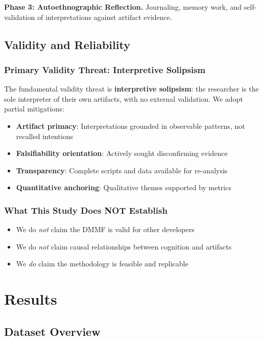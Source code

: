 \documentclass{ntlabs-preprint}
\begin{document}
\textbf{Phase 3: Autoethnographic Reflection.} Journaling, memory work, and self-validation of interpretations against artifact evidence.

\subsection{Validity and Reliability}

\subsubsection{Primary Validity Threat: Interpretive Solipsism}

The fundamental validity threat is \textbf{interpretive solipsism}: the researcher is the sole interpreter of their own artifacts, with no external validation. We adopt partial mitigations:

\begin{itemize}
    \item \textbf{Artifact primacy}: Interpretations grounded in observable patterns, not recalled intentions
    \item \textbf{Falsifiability orientation}: Actively sought disconfirming evidence
    \item \textbf{Transparency}: Complete scripts and data available for re-analysis
    \item \textbf{Quantitative anchoring}: Qualitative themes supported by metrics
\end{itemize}

\subsubsection{What This Study Does NOT Establish}

\begin{itemize}
    \item We do \textit{not} claim the DMMF is valid for other developers
    \item We do \textit{not} claim causal relationships between cognition and artifacts
    \item We \textit{do} claim the methodology is feasible and replicable
\end{itemize}

\section{Results}

\subsection{Dataset Overview}
\end{document}
